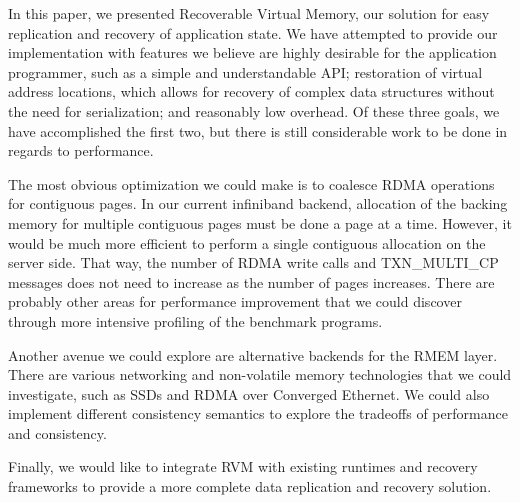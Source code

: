 In this paper, we presented Recoverable Virtual Memory, our solution for easy
replication and recovery of application state. We have attempted to provide
our implementation with features we believe are highly desirable for the
application programmer, such as a simple and understandable API; restoration
of virtual address locations, which allows for recovery of complex data
structures without the need for serialization; and reasonably low overhead.
Of these three goals, we have accomplished the first two, but there is still
considerable work to be done in regards to performance.

The most obvious optimization we could make is to coalesce RDMA operations for
contiguous pages. In our current infiniband backend, allocation of the backing
memory for multiple contiguous pages must be done a page at a time.
However, it would be much more efficient to perform a single contiguous
allocation on the server side. That way, the number of RDMA write calls and
TXN\_MULTI\_CP messages does not need to increase as the number of pages
increases. There are probably other areas for performance improvement that we
could discover through more intensive profiling of the benchmark programs.

Another avenue we could explore are alternative backends for the RMEM layer.
There are various networking and non-volatile memory technologies that we
could investigate, such as SSDs and RDMA over Converged Ethernet. We could also
implement different consistency semantics to explore the tradeoffs of performance
and consistency.

Finally, we would like to integrate RVM with existing runtimes and recovery
frameworks to provide a more complete data replication and recovery solution.
